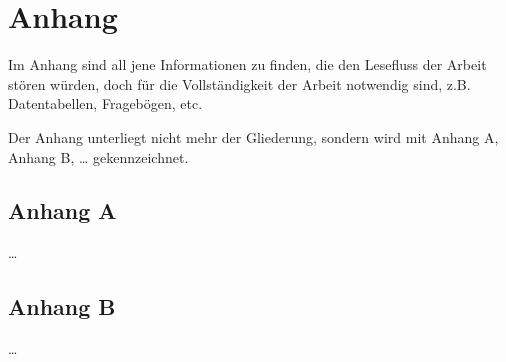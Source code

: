 \appendix
\renewcommand{\thechapter}{\Alph{chapter}}
\renewcommand{\thesection}{\Alph{section}}

{}
\chapter*{Anhang}

Im Anhang sind all jene Informationen zu finden, die den Lesefluss der Arbeit stören würden, doch für die Vollständigkeit der Arbeit notwendig sind, z.B. Datentabellen, Fragebögen, etc.

Der Anhang unterliegt nicht mehr der Gliederung, sondern wird mit Anhang A, Anhang B, \ldots{} gekennzeichnet.

\section*{Anhang A}
\ldots

\section*{Anhang B}
\ldots
